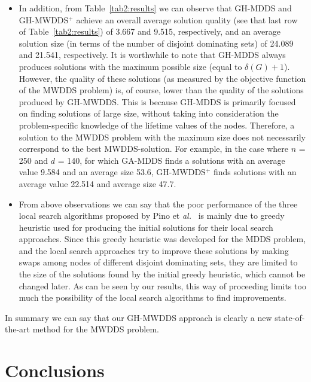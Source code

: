 \documentclass[algorithms,article,accept,moreauthors,pdftex]{Definitions/mdpi}
\begin{document}
\begin{paracol}{2}
\begin{itemize}
\item In addition, from Table~\ref{tab2:results} we can observe that GH-MDDS and GH-MWDDS$^{+}$ achieve an overall average solution quality (see that last row of Table~\ref{tab2:results}) of 3.667  and 9.515, respectively, and an average solution size (in terms of the number of disjoint dominating sets) of 24.089 and 21.541, respectively. It is worthwhile to note that GH-MDDS always produces solutions with the maximum possible size (equal to $\delta(G)+1$). However, the quality of these solutions (as measured by the objective function of the MWDDS problem) is, of course, lower than the quality of the solutions produced by GH-MWDDS. This is because GH-MDDS is primarily focused on finding solutions of large size, without taking into consideration the problem-specific knowledge of the lifetime values of the nodes. Therefore, a solution to the MWDDS problem with the maximum size does not necessarily correspond to the best MWDDS-solution. For example, in the case where $n$ = 250 and $d$ = 140, for which GA-MDDS finds a solutions with an average value 9.584 and an average size 53.6, GH-MWDDS$^{+}$ finds solutions with an average value 22.514 and average size 47.7. 

\item From above observations we can say that the poor performance of the three local search algorithms proposed by Pino et \textit{al.}~\cite{pino2018:dominating} is mainly due to greedy heuristic used for producing the initial solutions for their local search approaches. Since this greedy heuristic was developed for the MDDS problem, and the local search approaches try to improve these solutions by making swaps among nodes of different disjoint dominating sets, they are limited to the size of the solutions found by the initial greedy heuristic, which cannot be changed later. As can be seen by our results, this way of proceeding limits too much the possibility of the local search algorithms to find improvements.
\end{itemize}

In summary we can say that our GH-MWDDS approach is clearly a new state-of-the-art method for the MWDDS problem.



\section{Conclusions}
\label{sec:conclusions}


\end{paracol}
\end{document}
